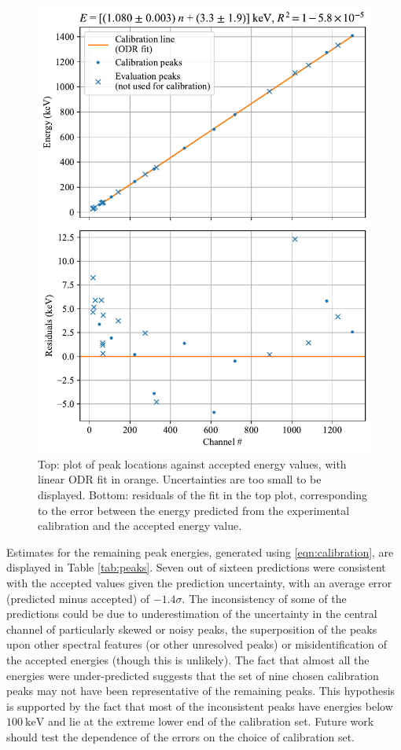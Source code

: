 \documentclass[twocol]{ametsocV6.1}
\begin{document}
\begin{figure}[ht]
	\includegraphics[width=\linewidth]{../figures/calibration.pdf}
	\caption{
		Top: plot of peak locations against accepted energy values,
		with linear ODR fit in orange. Uncertainties are too small to be
		displayed.
		Bottom: residuals of the fit in the top plot,
		corresponding to the error between the energy predicted from
		the experimental calibration and the accepted energy value.
	}
	\label{fig:calibration}
\end{figure}

Estimates for the remaining peak energies, generated using
\ref{eqn:calibration}, are displayed in Table \ref{tab:peaks}.
Seven out of sixteen predictions were consistent with the accepted values
given the prediction uncertainty, with an average error (predicted minus
accepted) of $-1.4\sigma$. The inconsistency of some of the predictions could
be due to underestimation of the uncertainty in the central channel of
particularly skewed or noisy peaks, the superposition of the peaks upon
other spectral features (or other unresolved peaks) or misidentification of
the accepted energies
(though this is unlikely). The fact that almost all the energies
were under-predicted suggests that the set of nine chosen calibration peaks
may not have been representative of the remaining peaks. This hypothesis
is supported by the fact that most of the inconsistent peaks have energies
below $\SI{100}{\kilo\electronvolt}$ and lie at the extreme lower end of
the calibration set. Future work should test the dependence of the errors
on the choice of calibration set.
\end{document}
